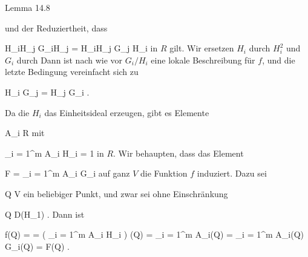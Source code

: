 {Lemma 14.8

und der Reduziertheit, dass

\mavergleichskettedisp
{\vergleichskette
{ H_iH_j G_iH_j
}
{ =} { H_iH_j G_j H_i
}
{ } {
}
{ } {
}
{ } {
}
}
{}{}{}
in $R$ gilt. Wir ersetzen $H_i$ durch $H_i^2$ und $G_i$ durch
 Dann ist nach wie vor $G_i/H_i$ eine lokale Beschreibung für $f$, und die letzte Bedingung vereinfacht sich zu

\mavergleichskettedisp
{\vergleichskette
{ H_i G_j
}
{ =} { H_j G_i
}
{ } {
}
{ } {
}
{ } {
}
}
{}{}{.}

Da die $H_i$ das Einheitsideal erzeugen, gibt es Elemente

\mavergleichskette
{\vergleichskette
{ A_i
}
{ \in }{ R
}
{  }{
}
{    }{
}
{   }{
}
}
{}{}{}
mit

\mavergleichskettedisp
{\vergleichskette
{ \sum_{i = 1}^m A_i H_i
}
{ =} { 1
}
{ } {
}
{ } {
}
{ } {
}
}
{}{}{}
in $R$. Wir behaupten, dass das Element

\mavergleichskettedisp
{\vergleichskette
{ F
}
{ =} { \sum_{i = 1}^m A_i G_i
}
{ } {
}
{ } {
}
{ } {
}
}
{}{}{}
auf ganz $V$ die Funktion $f$ induziert. Dazu sei

\mavergleichskette
{\vergleichskette
{ Q
}
{ \in }{ V
}
{  }{
}
{    }{
}
{   }{
}
}
{}{}{}
ein beliebiger Punkt, und zwar sei ohne Einschränkung

\mavergleichskette
{\vergleichskette
{ Q
}
{ \in }{ D(H_1)
}
{  }{
}
{    }{
}
{   }{
}
}
{}{}{.}
Dann ist

\mavergleichskettealign
{\vergleichskettealign
{ f(Q)
}
{ =} { 
}
{ =} {  \left(  \sum_{i = 1}^m A_i H_i  \right) (Q)
}
{ =} { \sum_{i = 1}^m A_i(Q) 
}
{ =} { \sum_{i = 1}^m A_i(Q) G_i(Q)
}
}
{
\vergleichskettefortsetzungalign
{ =} { F(Q)
}
{ } {}
{ } {}
{ } {}
}
{}{.}




}






